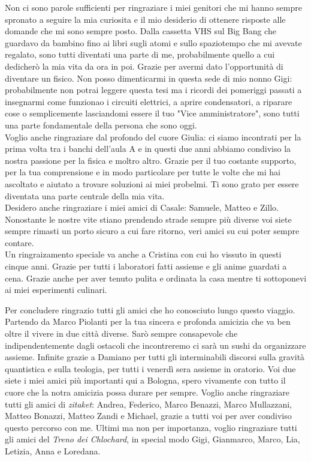 Non ci sono parole sufficienti per ringraziare i miei genitori che mi hanno sempre spronato a seguire la mia curiosita e il mio desiderio di ottenere risposte alle domande che mi sono sempre posto. Dalla cassetta VHS sul Big Bang che guardavo da bambino fino ai libri sugli atomi e sullo spaziotempo che mi avevate regalato, sono tutti diventati una parte di me, probabilmente quello a cui dedicherò la mia vita da ora in poi. Grazie per avermi dato l'opportunità di diventare un fisico. Non posso dimenticarmi in questa sede di mio nonno Gigi: probabilmente non potrai leggere questa tesi ma i ricordi dei pomeriggi passati a insegnarmi come funzionao i circuiti elettrici, a aprire condensatori, a riparare cose o semplicemente lasciandomi essere il tuo "Vice amministratore", sono tutti una parte fondamentale della persona che sono oggi.\\
Voglio anche ringraziare dal profondo del cuore Giulia: ci siamo incontrati per la prima volta tra i banchi dell'aula A e in questi due anni abbiamo condiviso la nostra passione per la fisica e moltro altro. Grazie per il tuo costante supporto, per la tua comprensione e in modo particolare per tutte le volte che mi hai ascoltato e aiutato a trovare soluzioni ai miei probelmi. Ti sono grato per essere diventata una parte centrale della mia vita.\\
Desidero anche ringraziare i miei amici di Casale: Samuele, Matteo e Zillo. Nonostante le nostre vite stiano prendendo strade sempre più diverse voi siete sempre rimasti un porto sicuro a cui fare ritorno, veri amici su cui poter sempre contare.\\
Un ringraizamento speciale va anche a Cristina con cui ho vissuto in questi cinque anni. Grazie per tutti i laboratori fatti assieme e gli anime guardati a cena. Grazie anche per aver tenuto pulita e ordinata la casa mentre ti sottoponevi ai miei esperimenti culinari.

Per concludere ringrazio tutti gli amici che ho conosciuto lungo questo viaggio. Partendo da Marco Piolanti per la tua sincera e profonda amicizia che va ben oltre il vivere in due città diverse. Sarò sempre consapevole che indipendentemente dagli ostacoli che incontreremo ci sarà un sushi da organizzare assieme. Infinite grazie a Damiano per tutti gli interminabili discorsi sulla gravità quantistica e sulla teologia, per tutti i venerdì sera assieme in oratorio. Voi due siete i miei amici più importanti qui a Bologna, spero vivamente con tutto il cuore che la notra amicizia possa durare per sempre. Voglio anche ringraziare tutti gli amici di \emph{zitaket}: Andrea, Federico, Marco Benazzi, Marco Mullazzani, Matteo Bonazzi, Matteo Zandi e Michael, grazie a tutti voi per aver condiviso questo percorso con me. Ultimi ma non per importanza, voglio ringraziare tutti gli amici del \emph{Treno dei Chlochard}, in special modo Gigi, Gianmarco, Marco, Lia, Letizia, Anna e Loredana.